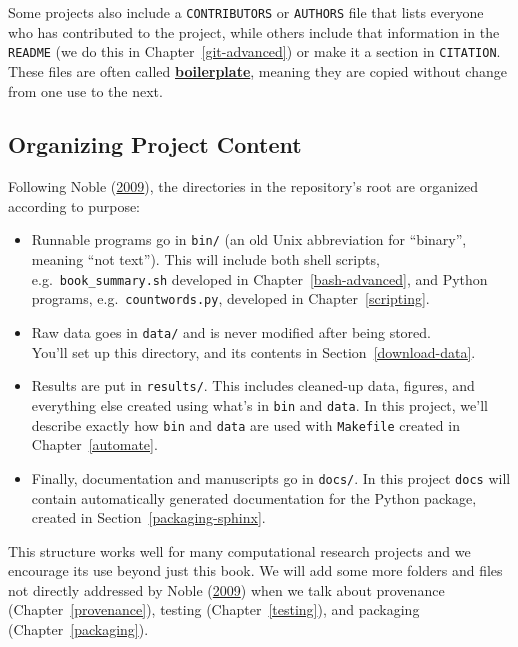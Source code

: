 \documentclass[
]{krantz}
\newcommand{\gref}[2]{\hyperlink{#2}{\textbf{#1}}}
\begin{document}
Some projects also include a \texttt{CONTRIBUTORS} or \texttt{AUTHORS} file that
lists everyone who has contributed to the project,
while others include that information in the \texttt{README} (we do this in Chapter~\ref{git-advanced})
or make it a section in \texttt{CITATION}.
These files are often called \gref{boilerplate}{boilerplate},
meaning they are copied without change from one use to the next.

\hypertarget{intro-organize}{%
\subsection{Organizing Project Content}\label{intro-organize}}

Following Noble (\protect\hyperlink{ref-Nobl2009}{2009}),
the directories in the repository's root are organized according to purpose:

\begin{itemize}
\item
  Runnable programs go in \texttt{bin/}
  (an old Unix abbreviation for ``binary'', meaning ``not text'').
  This will include both shell scripts,
  e.g.~\texttt{book\_summary.sh} developed in Chapter~\ref{bash-advanced},
  and Python programs,
  e.g.~\texttt{countwords.py}, developed in Chapter~\ref{scripting}.
\item
  Raw data goes in \texttt{data/}
  and is never modified after being stored.\\
  You'll set up this directory,
  and its contents in Section~\ref{download-data}.
\item
  Results are put in \texttt{results/}.
  This includes cleaned-up data,
  figures,
  and everything else created using what's in \texttt{bin} and \texttt{data}.
  In this project,
  we'll describe exactly how \texttt{bin} and \texttt{data} are used
  with \texttt{Makefile} created in Chapter~\ref{automate}.
\item
  Finally,
  documentation and manuscripts go in \texttt{docs/}.
  In this project \texttt{docs} will contain automatically generated
  documentation for the Python package, created in
  Section~\ref{packaging-sphinx}.
\end{itemize}

This structure works well for many computational research projects and
we encourage its use beyond just this book.
We will add some more folders and files not directly addressed by Noble (\protect\hyperlink{ref-Nobl2009}{2009})
when we talk about provenance (Chapter~\ref{provenance}),
testing (Chapter~\ref{testing}),
and packaging (Chapter~\ref{packaging}).
\end{document}
